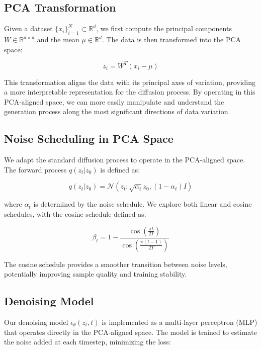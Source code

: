 \documentclass{article} %
\begin{document}
\subsection{PCA Transformation}
Given a dataset $\{x_i\}_{i=1}^{N} \subset \mathbb{R}^d$, we first compute the principal components $W \in \mathbb{R}^{d \times d}$ and the mean $\mu \in \mathbb{R}^d$. The data is then transformed into the PCA space:

\begin{equation}
    z_i = W^T(x_i - \mu)
\end{equation}

This transformation aligns the data with its principal axes of variation, providing a more interpretable representation for the diffusion process. By operating in this PCA-aligned space, we can more easily manipulate and understand the generation process along the most significant directions of data variation.

\subsection{Noise Scheduling in PCA Space}
We adapt the standard diffusion process to operate in the PCA-aligned space. The forward process $q(z_t|z_0)$ is defined as:

\begin{equation}
    q(z_t|z_0) = \mathcal{N}(z_t; \sqrt{\alpha_t}z_0, (1-\alpha_t)I)
\end{equation}

where $\alpha_t$ is determined by the noise schedule. We explore both linear and cosine schedules, with the cosine schedule defined as:

\begin{equation}
    \beta_t = 1 - \frac{\cos(\frac{\pi t}{2T})}{\cos(\frac{\pi (t-1)}{2T})}
\end{equation}

The cosine schedule provides a smoother transition between noise levels, potentially improving sample quality and training stability.

\subsection{Denoising Model}
Our denoising model $\epsilon_\theta(z_t, t)$ is implemented as a multi-layer perceptron (MLP) that operates directly in the PCA-aligned space. The model is trained to estimate the noise added at each timestep, minimizing the loss:
\end{document}
